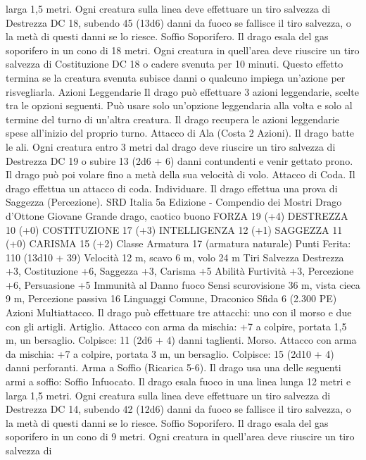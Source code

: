\begin{multicols}{2}
larga 1,5 metri. Ogni creatura sulla linea deve effettuare un tiro
salvezza di Destrezza DC 18, subendo 45 (13d6) danni da fuoco se
fallisce il tiro salvezza, o la metà di questi danni se lo riesce.
Soffio Soporifero. Il drago esala del gas soporifero in un cono di 18
metri. Ogni creatura in quell’area deve riuscire un tiro salvezza di
Costituzione DC 18 o cadere svenuta per 10 minuti. Questo effetto
termina se la creatura svenuta subisce danni o qualcuno impiega
un’azione per risvegliarla.
Azioni Leggendarie
Il drago può effettuare 3 azioni leggendarie, scelte tra le opzioni
seguenti. Può usare solo un’opzione leggendaria alla volta e solo
al termine del turno di un’altra creatura. Il drago recupera le
azioni leggendarie spese all’inizio del proprio turno.
Attacco di Ala (Costa 2 Azioni). Il drago batte le ali. Ogni
creatura entro 3 metri dal drago deve riuscire un tiro salvezza di
Destrezza DC 19 o subire 13 (2d6 + 6) danni contundenti e venir
gettato prono. Il drago può poi volare fino a metà della sua
velocità di volo.
Attacco di Coda. Il drago effettua un attacco di coda.
Individuare. Il drago effettua una prova di Saggezza
(Percezione).
SRD Italia 5a Edizione - Compendio dei Mostri
Drago d’Ottone Giovane
Grande drago, caotico buono
FORZA 19 (+4)
DESTREZZA 10 (+0)
COSTITUZIONE 17 (+3)
INTELLIGENZA 12 (+1)
SAGGEZZA 11 (+0)
CARISMA 15 (+2)
Classe Armatura 17 (armatura naturale)
\hspace*{0pt}\hfill{Punti Ferita}: 110 (13d10 + 39)
Velocità 12 m, scavo 6 m, volo 24 m
Tiri Salvezza Destrezza +3, Costituzione +6, Saggezza +3,
Carisma +5
Abilità Furtività +3, Percezione +6, Persuasione +5
Immunità al Danno fuoco
Sensi scurovisione 36 m, vista cieca 9 m, Percezione passiva 16
Linguaggi Comune, Draconico
Sfida 6 (2.300 PE)
Azioni
Multiattacco. Il drago può effettuare tre attacchi: uno con il
morso e due con gli artigli.
Artiglio. Attacco con arma da mischia: +7 a colpire, portata 1,5
m, un bersaglio.
Colpisce: 11 (2d6 + 4) danni taglienti.
Morso. Attacco con arma da mischia: +7 a colpire, portata 3 m,
un bersaglio.
Colpisce: 15 (2d10 + 4) danni perforanti.
Arma a Soffio (Ricarica 5-6). Il drago usa una delle seguenti armi
a soffio:
Soffio Infuocato. Il drago esala fuoco in una linea lunga 12 metri e
larga 1,5 metri. Ogni creatura sulla linea deve effettuare un tiro
salvezza di Destrezza DC 14, subendo 42 (12d6) danni da fuoco se
fallisce il tiro salvezza, o la metà di questi danni se lo riesce.
Soffio Soporifero. Il drago esala del gas soporifero in un cono di 9
metri. Ogni creatura in quell’area deve riuscire un tiro salvezza di

\end{multicols}
